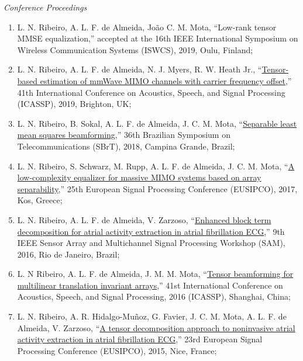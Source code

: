 \newpage
{\sl Conference Proceedings}

\begin{enumerate}
	\item L. N. Ribeiro, A. L. F. de Almeida, Jo\~ao C. M. Mota, ``Low-rank tensor MMSE equalization,'' accepted at the 16th IEEE International Symposium on Wireless Communication Systems (ISWCS), 2019, Oulu, Finland;
			
	\item L. N. Ribeiro, A. L. F. de Almeida, N. J. Myers, R. W. Heath Jr., ``\href{https://doi.org/10.1109/ICASSP.2019.8683496}{Tensor-based estimation of mmWave MIMO channels with carrier frequency offset},'' 41th International Conference on Acoustics, Speech, and Signal Processing (ICASSP), 2019, Brighton, UK;
	
	\item L. N. Ribeiro, B. Sokal, A. L. F. de Almeida, J. C. M. Mota, ``\href{https://github.com/lnribeiro/lnribeiro.github.io/blob/master/assets/pdf/sbrt18.pdf}{Separable least mean squares beamforming},'' 36th Brazilian Symposium on Telecommunications (SBrT), 2018, Campina Grande, Brazil;
	
	\item L. N. Ribeiro, S. Schwarz, M. Rupp, A. L. F. de Almeida, J. C. M. Mota, ``\href{https://doi.org/10.23919/EUSIPCO.2017.8081651}{A low-complexity equalizer for massive MIMO systems based on array separability},'' 25th European Signal Processing Conference (EUSIPCO), 2017, Kos, Greece;
	
	\item L. N. Ribeiro, A. L. F. de Almeida, V. Zarzoso, ``\href{https://doi.org/10.1109/SAM.2016.7569709}{Enhanced block term decomposition for atrial activity extraction in atrial fibrillation ECG},'' 9th IEEE Sensor Array and Multichannel Signal Processing Workshop (SAM), 2016, Rio de Janeiro, Brazil;
	
	\item L. N Ribeiro,  A. L. F. de Almeida, J. M. M. Mota, ``\href{https://doi.org/10.1109/ICASSP.2016.7472221}{Tensor beamforming for multilinear translation invariant arrays},'' 41st International Conference on Acoustics, Speech, and Signal Processing, 2016 (ICASSP), Shanghai, China;
	
	\item  L. N. Ribeiro, A. R. Hidalgo-Mu\~{n}oz, G. Favier, J. C. M. Mota, A. L. F. de Almeida,  V. Zarzoso, ``\href{https://doi.org/10.1109/EUSIPCO.2015.7362850}{A tensor decomposition approach to noninvasive atrial activity extraction in atrial fibrillation ECG},'' 23rd European Signal Processing Conference (EUSIPCO), 2015, Nice, France;
	

\end{enumerate}
